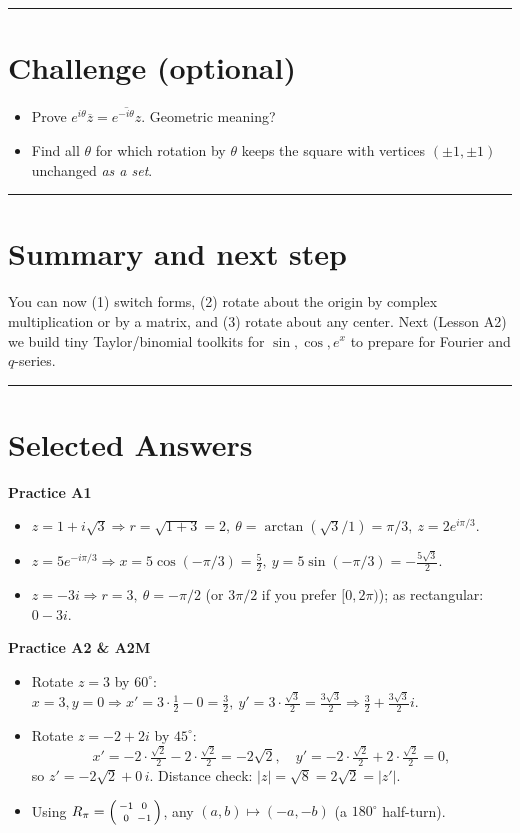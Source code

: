 \documentclass[11pt]{article}
\begin{document}
\bigskip
\hrule
\bigskip

\section*{Challenge (optional)}
\begin{itemize}
  \item Prove \(e^{i\theta}\overline{z}=\overline{e^{-i\theta}z}\). Geometric meaning?
  \item Find all \(\theta\) for which rotation by \(\theta\) keeps the square with vertices \((\pm1,\pm1)\) unchanged \emph{as a set}.
\end{itemize}

\bigskip
\hrule
\bigskip

\section*{Summary and next step}
You can now (1) switch forms, (2) rotate about the origin by complex multiplication or by a matrix, and (3) rotate about any center. Next (Lesson A2) we build tiny Taylor/binomial toolkits for \(\sin,\cos,e^x\) to prepare for Fourier and \(q\)-series.

\bigskip
\hrule
\bigskip

\section*{Selected Answers}\label{answersA1}
\textbf{Practice A1}
\begin{itemize}
  \item \(z=1+i\sqrt{3}\Rightarrow r=\sqrt{1+3}=2,\ \theta=\arctan(\sqrt{3}/1)=\pi/3,\ z=2e^{i\pi/3}.\)
  \item \(z=5e^{-i\pi/3}\Rightarrow x=5\cos(-\pi/3)=\tfrac{5}{2},\ y=5\sin(-\pi/3)=-\tfrac{5\sqrt3}{2}.\)
  \item \(z=-3i\Rightarrow r=3,\ \theta=-\pi/2\) (or \(3\pi/2\) if you prefer \([0,2\pi)\)); as rectangular: \(0-3i\).
\end{itemize}

\textbf{Practice A2 \& A2M}
\begin{itemize}
  \item Rotate \(z=3\) by \(60^\circ\): \(x=3,y=0\Rightarrow x'=3\cdot\tfrac12-0= \tfrac{3}{2},\ y'=3\cdot\tfrac{\sqrt3}{2}=\tfrac{3\sqrt3}{2}\Rightarrow \tfrac{3}{2}+\tfrac{3\sqrt3}{2}i.\)
  \item Rotate \(z=-2+2i\) by \(45^\circ\):
  \[
  x'=-2\cdot\tfrac{\sqrt2}{2}-2\cdot\tfrac{\sqrt2}{2}=-2\sqrt2,\quad
  y'=-2\cdot\tfrac{\sqrt2}{2}+2\cdot\tfrac{\sqrt2}{2}=0,
  \]
  so \(z'=-2\sqrt2+0\,i\). Distance check: \(|z|=\sqrt{8}=2\sqrt{2}=|z'|\).
  \item Using \(R_\pi=\begin{psmallmatrix}-1&0\\[2pt]0&-1\end{psmallmatrix}\), any \((a,b)\mapsto(-a,-b)\) (a \(180^\circ\) half-turn).
\end{itemize}
\end{document}
